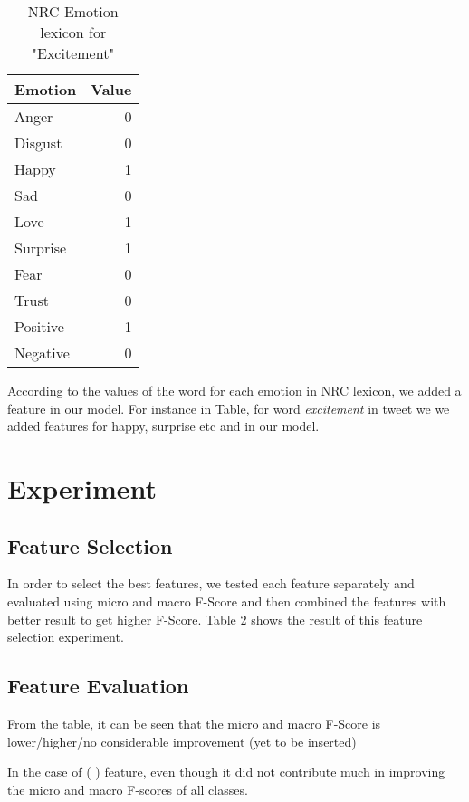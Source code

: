 \documentclass[11pt]{article}
\begin{document}
  \begin{table}[h]
  \begin{center}
  \begin{tabular}{|l|r|}
  \hline \bf Emotion & \bf Value\\ \hline
  Anger & 0\\
  Disgust & 0\\
  Happy & 1\\
  Sad & 0\\
  Love & 1\\
  Surprise & 1\\
  Fear & 0\\
  Trust & 0\\
  Positive & 1\\
  Negative & 0\\
  \hline
  \end{tabular}
  \end{center}
  \caption{\label{font-table} NRC Emotion lexicon for "Excitement"}
  \end{table}
  
  According to the values of the word for each emotion in NRC lexicon, we added a feature in our model. For instance in Table, for word \emph{excitement} in tweet we
  we added features for happy, surprise etc and in our model.
  
  \section{Experiment}
  
  \subsection{Feature Selection}
  
  In order to select the best features, we tested each feature separately and evaluated using micro and macro F-Score and then combined the features
  with better result to get higher F-Score. Table 2 shows the result of this feature selection experiment.
  
  \subsection{Feature Evaluation}
  
  From the table, it can be seen that the micro and macro F-Score is lower/higher/no considerable improvement (yet to be inserted)
  
  
  In the case of ( ) feature, even though it did not contribute much in improving the micro and macro F-scores of all classes.
  
\end{document}
